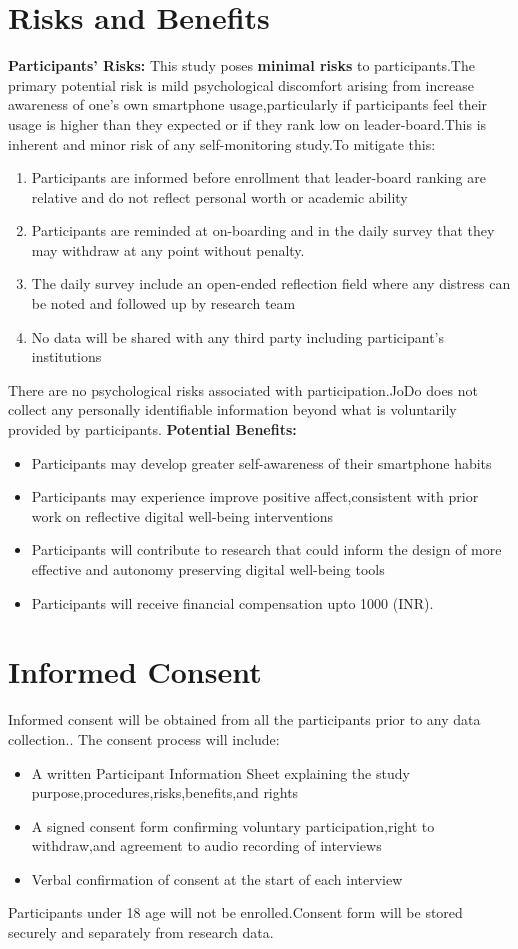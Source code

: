 \documentclass[12pt,a4paper]{article}
\begin{document}
\section{Risks and Benefits}
\textbf{Participants' Risks:}
This study poses \textbf{minimal risks} to participants.The primary potential risk is mild psychological discomfort arising from increase awareness of one's own smartphone usage,particularly if participants feel their usage is higher than they expected or if they rank low on leader-board.This is inherent and minor risk of any self-monitoring study.To mitigate this:
\begin{enumerate}
    \item Participants are informed before enrollment that leader-board ranking are relative and do not reflect personal worth or academic ability
    \item Participants are reminded at on-boarding and in the daily survey that they may withdraw at any point without penalty.
    \item The daily survey include an open-ended reflection field where any distress can be noted and followed up by research team
    \item No data will be shared with any third party including participant's institutions
\end{enumerate}
There are no psychological risks associated with participation.JoDo does not collect any personally identifiable information beyond what is voluntarily provided by participants.
\textbf{Potential Benefits:}
\begin{itemize}
    \item Participants may develop greater self-awareness of their smartphone habits
    \item Participants may experience improve positive affect,consistent with prior work on reflective digital well-being interventions
    \item Participants will contribute to research that could inform the design of more effective and autonomy preserving digital well-being tools
    \item Participants will receive financial compensation upto 1000 (INR).
\end{itemize}
\section{Informed Consent}
Informed consent will be obtained from all the participants prior to any data collection.. The consent process will include:
\begin{itemize}
    \item A written Participant Information Sheet explaining the study purpose,procedures,risks,benefits,and rights
    \item A signed consent form confirming voluntary participation,right to withdraw,and agreement to audio recording of interviews
    \item Verbal confirmation of consent at the start of each interview
\end{itemize}
Participants under 18 age will not be enrolled.Consent form will be stored securely and separately from research data.
\end{document}

